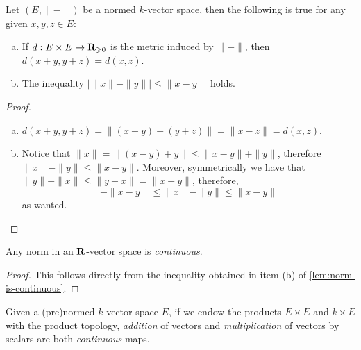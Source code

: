 \begin{lemma}
\label{lem:norm-is-continuous}
Let \((E, \| - \|)\) be a normed \(k\)-vector space, then the following is true
for any given \(x, y, z \in E\):
\begin{enumerate}[(a)]\setlength\itemsep{0em}
\item If \(d: E \times E \to \mathbf{R}_{\geqslant 0}\) is the metric induced by \(\| - \|\),
then \(d(x + y, y + z) = d(x, z)\).

\item The inequality \(\big| \| x \| - \| y \| \big| \leq \| x - y \|\) holds.
\end{enumerate}
\end{lemma}

\begin{proof}
\begin{enumerate}[(a)]\setlength\itemsep{0em}
\item \(d(x + y, y + z) = \| (x + y) - (y + z)\| = \| x - z \| = d(x, z)\).

\item Notice that \(\| x \| = \| (x - y) + y \| \leq \| x - y \| + \| y \|\),
therefore \(\| x \| - \| y \| \leq \| x - y \|\). Moreover, symmetrically we
have that \(\| y \| - \| x \| \leq \| y - x \| = \| x - y \|\), therefore,
\[
- \| x - y \| \leq \| x \| - \| y \| \leq \| x - y \|
\]
as wanted.
\end{enumerate}
\end{proof}

\begin{proposition}
\label{prop:norm-is-continuous}
Any norm in an \(\mathbf{R}\)-vector space is \emph{continuous}.
\end{proposition}

\begin{proof}
This follows directly from the inequality obtained in item (b) of
\cref{lem:norm-is-continuous}.
\end{proof}

\begin{proposition}
\label{prop:continuity-sum-multiplication-scalar}
Given a (pre)normed \(k\)-vector space \(E\), if we endow the products \(E
\times E\) and \(k \times E\) with the product topology, \emph{addition} of
vectors and \emph{multiplication} of vectors by scalars are both
\emph{continuous} maps.
\end{proposition}

